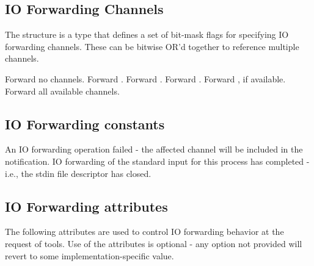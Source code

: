 \subsection{IO Forwarding Channels}
\label{api:tool:iofchannels}

The  structure is a  type that defines a set of bit-mask flags for specifying IO forwarding channels. These can be bitwise OR'd together to reference multiple channels.

\begin{constantdesc}
%
Forward no channels.
%
Forward .
%
Forward .
%
Forward .
%
Forward , if available.
%
Forward all available channels.
%
\end{constantdesc}

\subsection{IO Forwarding constants}

\begin{constantdesc}
%
An \ac{IO} forwarding operation failed - the affected channel will be included in the notification.
%
\ac{IO} forwarding of the standard input for this process has completed - i.e., the stdin file descriptor has closed.
%
\end{constantdesc}

\subsection{IO Forwarding attributes}
\label{api:tools:attributes:iof}

The following attributes are used to control \ac{IO} forwarding behavior at the request of tools. Use of the attributes is optional - any option not provided will revert to some implementation-specific value.

